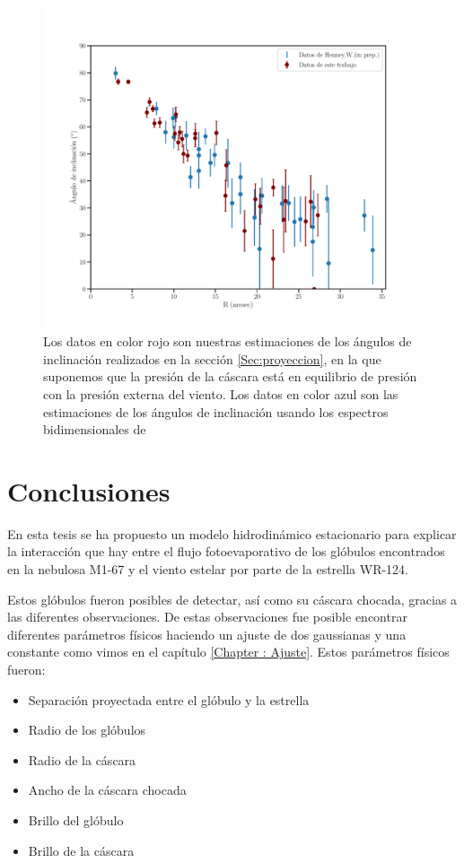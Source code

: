 \documentclass{book}
\begin{document}
\begin{figure}[htb]
    \centering
    \includegraphics[width=\textwidth]{imagenes_corregidas/W.pdf}
    \caption{Los datos en color rojo son nuestras estimaciones de los ángulos de inclinación realizados en la sección \ref{Sec:proyeccion}, en la que suponemos que la presión de la cáscara está en equilibrio de presión con la presión externa del viento. Los datos en color azul son las estimaciones de los ángulos de inclinación usando los espectros bidimensionales de \cite{Zavala:2022}}
    \label{fig:ang_Will}
\end{figure}

\chapter{Conclusiones}

En esta tesis se ha propuesto un modelo hidrodinámico estacionario para explicar la interacción que hay entre el flujo fotoevaporativo de los glóbulos encontrados en la nebulosa M1-67 y el viento estelar por parte de la estrella WR-124. 

Estos glóbulos fueron posibles de detectar, así como su cáscara chocada, gracias a las diferentes observaciones. De estas observaciones fue posible encontrar diferentes parámetros físicos haciendo un ajuste de dos gaussianas y una constante como vimos en el capítulo \ref{Chapter : Ajuste}. Estos parámetros físicos fueron:

\begin{itemize}
    \item Separación proyectada entre el glóbulo y la estrella
    \item Radio de los glóbulos
    \item Radio de la cáscara
    \item Ancho de la cáscara chocada
    \item Brillo del glóbulo
    \item Brillo de la cáscara
\end{itemize}
\end{document}
